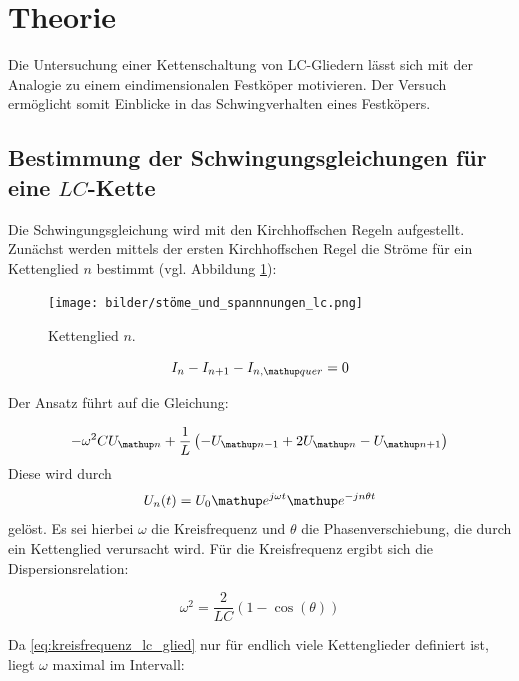 \setcounter{page}{1}


\section{Theorie}
Die Untersuchung einer Kettenschaltung von LC-Gliedern lässt sich mit der Analogie
zu einem eindimensionalen Festköper motivieren.
Der Versuch ermöglicht somit Einblicke in das Schwingverhalten eines
Festköpers. %

\subsection{Bestimmung der Schwingungsgleichungen für eine $LC$-Kette} %
Die Schwingungsgleichung wird mit den Kirchhoffschen Regeln aufgestellt. %
Zunächst werden mittels der ersten Kirchhoffschen Regel die Ströme für ein Kettenglied $n$ %
bestimmt (vgl. Abbildung \ref{fig:kettenglied}):

\begin{figure}
  \centering
  \texttt{[image: bilder/stöme\_und\_spannnungen\_lc.png]}
  \caption{Kettenglied $n$.\cite{anleitung356}} %
  \label{fig:kettenglied}
\end{figure}

\begin{equation}
\label{eq:kircheins_lc}
I_n-I_{n+1}-I_{n,\map{quer}}=0
\end{equation}

Der Ansatz führt auf die Gleichung:

\begin{equation}
\label{eq:gleichung_lc}
-\omega^2CU\ua{n}+\frac{1}{L}\left(-U\ua{n-1}+2U\ua{n}-U\ua{n+1}\right)
\end{equation}
Diese wird durch
\begin{equation}
\label{eq:loesung_gleichung_lc}
U_n(t)=U_0 \map{e}^{j\omega t} \map{e}^{-jn\theta t}
\end{equation}
gelöst.
Es sei hierbei $\omega$ die Kreisfrequenz und $\theta$ die Phasenverschiebung, %
die durch ein Kettenglied verursacht wird.
Für die Kreisfrequenz ergibt sich die Dispersionsrelation:

\begin{equation}
\label{eq:kreisfrequenz_lc_glied}
\omega^2=\frac{2}{LC}\left(1-\cos(\theta)\right)
\end{equation}

Da \eqref{eq:kreisfrequenz_lc_glied} nur für endlich viele Kettenglieder definiert ist,
liegt $\omega$ maximal im Intervall: %


